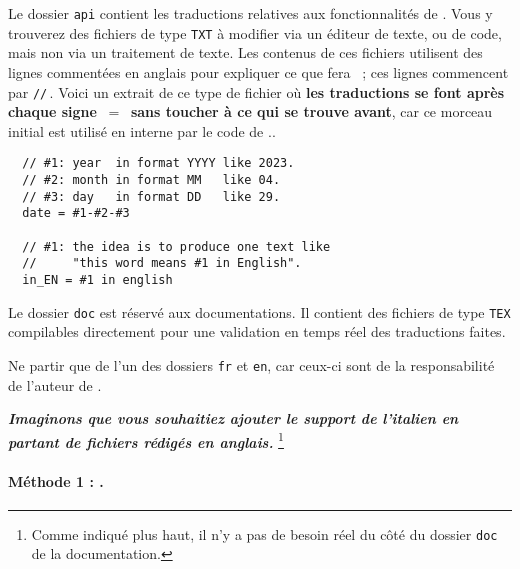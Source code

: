 \begin{tdocimp}
    Le dossier \verb#api# contient les traductions relatives aux fonctionnalités de \thisproj.
    Vous y trouverez des fichiers de type \verb#TXT# à modifier via un éditeur de texte, ou de code, mais non via un traitement de texte.
    Les contenus de ces fichiers utilisent des lignes commentées en anglais pour expliquer ce que fera \thisproj\ ; ces lignes commencent par \verb#//#\,. Voici un extrait de ce type de fichier où \textbf{les traductions se font après chaque signe \,$=$\, sans toucher à ce qui se trouve avant}, car ce morceau initial est utilisé en interne par le code de \thisproj..

    \tdocsep
    \vspace{-10pt}
    \begin{verbatim}
  // #1: year  in format YYYY like 2023.
  // #2: month in format MM   like 04.
  // #3: day   in format DD   like 29.
  date = #1-#2-#3

  // #1: the idea is to produce one text like
  //     "this word means #1 in English".
  in_EN = #1 in english\end{verbatim}
\end{tdocimp}


\begin{tdocnote}
    Le dossier \verb#doc# est réservé aux documentations. Il contient des fichiers de type \verb#TEX# compilables directement pour une validation en temps réel des traductions faites.
\end{tdocnote}


\begin{tdocwarn}
    Ne partir que de l'un des dossiers \verb#fr# et \verb#en#, car ceux-ci sont de la responsabilité de l'auteur de \thisproj.
\end{tdocwarn}


\medskip


\emph{\textbf{Imaginons que vous souhaitiez ajouter le support de l'italien en partant de fichiers rédigés en anglais.}}%
\footnote{
    Comme indiqué plus haut, il n'y a pas de besoin réel du côté du dossier \texttt{doc} de la documentation.
}


\paragraph{Méthode 1 : \git.}

